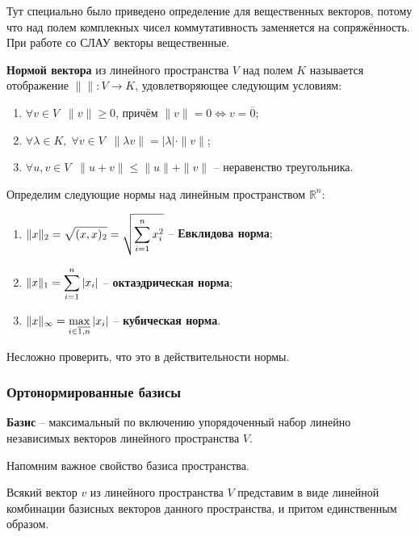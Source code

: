 \documentclass{article}
\begin{document}
Тут специально было приведено определение для вещественных векторов, потому что
над полем комплекных чисел коммутативность заменяется на сопряжённость. При
работе со СЛАУ векторы вещественные.

\begin{define}\label{eq:vector_norm}
	\textbf{Нормой вектора} из линейного пространства $V$ над полем $K$
	называется отображение $\|\|: V\rightarrow K$, удовлетворяющее
	следующим условиям:
	\begin{enumerate}[nosep]
		\item $\forall v\in V\;\; \|v\|\ge 0$, причём $\|v\|=0
			\Leftrightarrow v=\overline{0}$;
		\item $\forall \lambda\in K,\;\forall v\in V\;\;
			\|\lambda v\|=|\lambda|\cdot\|v\|$;
		\item $\forall u,v\in V\;\; \|u+v\|\le\|u\|+\|v\|$ --
			неравенство треугольника.
	\end{enumerate}
\end{define}

\begin{define}\label{eq:some_vector_norms}
	Определим следующие нормы над линейным пространством $\mathbb R^n$:
	\begin{enumerate}[nosep]
		\item $\mathlarger{\|x\|_2=\sqrt{(x,x)_2}=\sqrt{\sum_{i=1}^{n}
			x_i^2}}$ -- \textbf{Евклидова норма};
		\item $\mathlarger{\|x\|_1=\sum_{i=1}^{n}|x_i|}$ --
			\textbf{октаэдрическая норма}; \\
		\item $\mathlarger{\|x\|_\infty=\max_{i\in\overline{1,n}}
			|x_i|}$ -- \textbf{кубическая норма}.
	\end{enumerate}
\end{define}

Несложно проверить, что это в действительности нормы.

\subsubsection{Ортонормированные базисы}
\begin{define}
	\textbf{Базис} -- максимальный по включению упорядоченный набор линейно
	независимых векторов линейного пространства $V$.
\end{define}

Напомним важное свойство базиса пространства.
\begin{theorem}
	Всякий вектор $v$ из линейного пространства $V$ представим в виде
	линейной комбинации базисных векторов данного пространства, и притом
	единственным образом.
\end{theorem}
\end{document}
